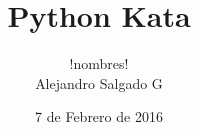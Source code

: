 \documentclass{beamer}
\begin{document}
    \title{Python Kata}
    \author{!nombres! \\
            Alejandro Salgado G}
    \date{7 de Febrero de 2016}

    \frame{ \titlepage }

    
    
    
    
    
    
\end{document}
